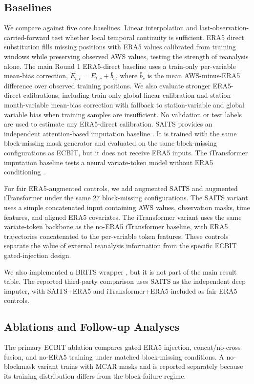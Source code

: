 \subsection{Baselines}
We compare against five core baselines. Linear interpolation and last-observation-carried-forward test whether local temporal continuity is sufficient. ERA5 direct substitution fills missing positions with ERA5 values calibrated from training windows while preserving observed AWS values, testing the strength of reanalysis alone. The main Round 1 ERA5-direct baseline uses a train-only per-variable mean-bias correction, $\tilde{E}_{t,c}=E_{t,c}+\bar{b}_c$, where $\bar{b}_c$ is the mean AWS-minus-ERA5 difference over observed training positions. We also evaluate stronger ERA5-direct calibrations, including train-only global linear calibration and station-month-variable mean-bias correction with fallback to station-variable and global variable bias when training samples are insufficient. No validation or test labels are used to estimate any ERA5-direct calibration. SAITS provides an independent attention-based imputation baseline \citep{du2023saits}. It is trained with the same block-missing mask generator and evaluated on the same block-missing configurations as ECBIT, but it does not receive ERA5 inputs. The iTransformer imputation baseline tests a neural variate-token model without ERA5 conditioning \citep{liu2024itransformer}.

For fair ERA5-augmented controls, we add augmented SAITS and augmented iTransformer under the same 27 block-missing configurations. The SAITS variant uses a simple concatenated input containing AWS values, observation masks, time features, and aligned ERA5 covariates. The iTransformer variant uses the same variate-token backbone as the no-ERA5 iTransformer baseline, with ERA5 trajectories concatenated to the per-variable token features. These controls separate the value of external reanalysis information from the specific ECBIT gated-injection design.

We also implemented a BRITS wrapper \citep{cao2018brits}, but it is not part of the main result table. The reported third-party comparison uses SAITS as the independent deep imputer, with SAITS+ERA5 and iTransformer+ERA5 included as fair ERA5 controls.

\subsection{Ablations and Follow-up Analyses}
The primary ECBIT ablation compares gated ERA5 injection, concat/no-cross fusion, and no-ERA5 training under matched block-missing conditions. A no-blockmask variant trains with MCAR masks and is reported separately because its training distribution differs from the block-failure regime.

